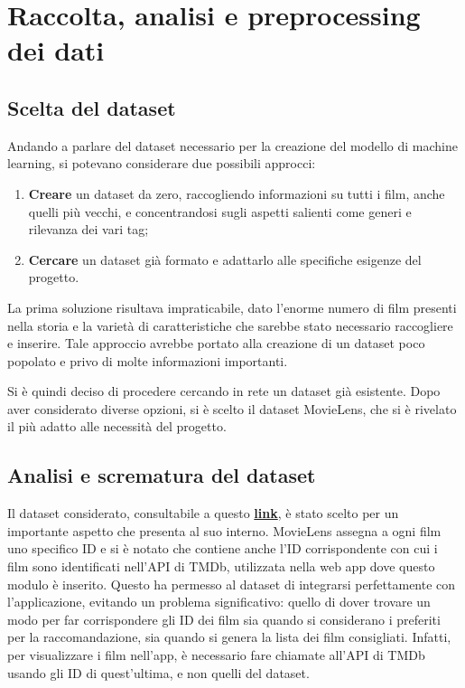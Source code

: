 \documentclass[a4paper,12pt]{article}
\begin{document}
\section{Raccolta, analisi e preprocessing dei dati}

    \subsection{Scelta del dataset} 
		Andando a parlare del dataset necessario per la creazione del modello di machine learning, si potevano considerare due possibili approcci:

		\begin{enumerate}
   			 \item \textbf{Creare} un dataset da zero, raccogliendo informazioni su tutti i film, anche quelli più vecchi, e concentrandosi sugli aspetti salienti come generi e rilevanza dei vari tag;
    			 \item \textbf{Cercare} un dataset già formato e adattarlo alle specifiche esigenze del progetto.
		\end{enumerate}

		La prima soluzione risultava impraticabile, dato l'enorme numero di film presenti nella storia e la varietà di caratteristiche che sarebbe stato necessario raccogliere e inserire. Tale approccio avrebbe portato alla creazione di un dataset poco popolato e privo di molte informazioni importanti.

		Si è quindi deciso di procedere cercando in rete un dataset già esistente. Dopo aver considerato diverse opzioni, si è scelto il dataset MovieLens, che si è rivelato il più adatto alle necessità del progetto.

    \subsection{Analisi e scrematura del dataset}
Il dataset considerato, consultabile a questo \textcolor{blue}{\href{https://grouplens.org/datasets/movielens/latest/}{\textbf{{link}}}}, è stato scelto per un importante aspetto che presenta al suo interno. MovieLens assegna a ogni film uno specifico ID e si è notato che contiene anche l'ID corrispondente con cui i film sono identificati nell'API di TMDb, utilizzata nella web app dove questo modulo è inserito. Questo ha permesso al dataset di integrarsi perfettamente con l'applicazione, evitando un problema significativo: quello di dover trovare un modo per far corrispondere gli ID dei film sia quando si considerano i preferiti per la raccomandazione, sia quando si genera la lista dei film consigliati. Infatti, per visualizzare i film nell'app, è necessario fare chiamate all'API di TMDb usando gli ID di quest'ultima, e non quelli del dataset.
\newpage
\end{document}
